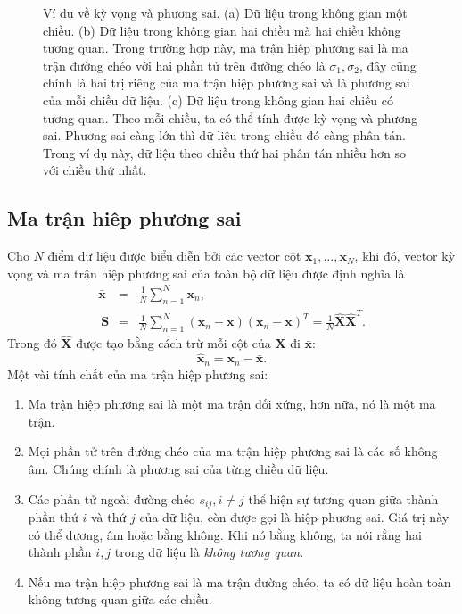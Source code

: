 \documentclass[14pt,oneside,a4paper]{report}
\numberwithin{equation}{section}
\begin{document}
\begin{figure}[t]
\begin{subfigure}{0.325\textwidth}
	\caption{}
	\label{fig:27_2c}
\end{subfigure}
\caption{
	Ví dụ về kỳ vọng và phương sai. (a) Dữ liệu trong không gian
	một chiều. (b) Dữ liệu trong không gian hai chiều mà hai chiều
	không tương quan. Trong trường hợp này, ma trận hiệp phương sai là ma trận
	đường chéo với hai phần tử trên đường chéo  là $\sigma_1, \sigma_2$, đây
	cũng chính là hai trị riêng của ma trận hiệp phương sai và là phương sai
	của mỗi chiều dữ liệu. (c) Dữ liệu trong không gian hai chiều có tương
	quan. Theo mỗi chiều, ta có thể tính được kỳ vọng và phương sai. Phương sai
	càng lớn thì dữ liệu trong chiều đó càng phân tán. Trong ví dụ này, dữ liệu
	theo chiều thứ hai phân tán nhiều hơn so với chiều thứ nhất. }
\label{fig:27_2}
\end{figure}

\subsection{Ma trận hiêp phương sai}

Cho $N$ điểm dữ liệu được biểu diễn bởi các vector cột $\mathbf{x}_1, \dots, \mathbf{x}_N$, khi đó, {vector kỳ vọng} và {ma trận hiệp phương sai} của toàn bộ dữ liệu được định nghĩa là
\begin{eqnarray} 
\bar{\mathbf{x}} &=& \frac{1}{N} \sum_{n=1}^N \mathbf{x}_n, \\\ 
\mathbf{S} &=&  \frac{1}{N}\sum_{n=1}^N (\mathbf{x}_n - \bar{\mathbf{x}})(\mathbf{x}_n - \bar{\mathbf{x}})^T = \frac{1}{N}\hat{\mathbf{X}}\hat{\mathbf{X}}^T.
\end{eqnarray} 
Trong đó $\hat{\mathbf{X}}$ được tạo bằng cách trừ mỗi cột của $\mathbf{X}$ đi $\bar{\mathbf{x}}$: 
\begin{equation} 
\hat{\mathbf{x}}_n = \mathbf{x}_n - \bar{\mathbf{x}}.
\end{equation} 
\newpage 
Một vài tính chất của ma trận hiệp phương sai: 
\begin{enumerate}

\item Ma trận hiệp phương sai là một ma trận đối xứng, hơn nữa, nó là một ma trận.

\item Mọi phần tử trên đường chéo của ma trận hiệp phương sai là các số không âm. Chúng chính là phương sai của từng chiều dữ liệu. 

\item Các phần tử ngoài đường chéo $s_{ij}, i \neq j$ thể hiện sự tương quan
giữa thành phần thứ $i$ và thứ $j$ của dữ liệu, còn được gọi là hiệp phương
sai. Giá trị này có thể dương, âm hoặc bằng không. Khi nó bằng không, ta nói
rằng hai thành phần $i, j$ trong dữ liệu là \textit{không tương quan}.

\item Nếu ma trận hiệp phương sai là ma trận đường chéo, ta có dữ liệu hoàn toàn không tương quan giữa các chiều. 
\end{enumerate}
\end{document}
